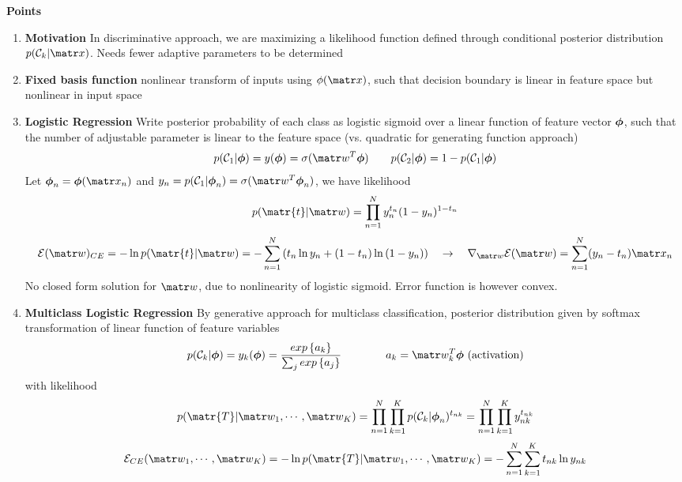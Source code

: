 \documentclass[11pt]{article}
\begin{document}
\begin{defn*}
    \textbf{Points}
    \begin{enumerate}
        \item \textbf{Motivation} In discriminative approach, we are maximizing a likelihood function defined through conditional posterior distribution $p(\calC_k | \bx)$. Needs fewer adaptive parameters to be determined
        \item \textbf{Fixed basis function} nonlinear transform of inputs using $\phi(\bx)$, such that decision boundary is linear in feature space but nonlinear in input space 
        \item \textbf{Logistic Regression} Write posterior probability of each class as logistic sigmoid over a linear function of feature vector $\boldsymbol{\phi}$, such that the number of adjustable parameter is linear to the feature space (vs. quadratic for generating function approach)
        \[
            p(\calC_1 | \bphi) = y(\bphi) = \sigma(\bw^T \bphi)
            \qquad 
            p(\calC_2 | \bphi) = 1 - p(\calC_1 | \bphi)
        \]
        Let $\bphi_n = \bphi(\bx_n)$ and $y_n = p(\calC_1 | \bphi_n) = \sigma(\bw^T \bphi_n)$, we have likelihood
        \[
            p(\matr{t}|\bw) = \prod_{n=1}^N y_n^{t_n} (1-y_n)^{1-t_n}
        \]
        \[
            \mathcal{E}(\bw)_{CE} = -\ln{p(\matr{t}|\bw)} = 
            -\sum_{n=1}^N \left(t_n \ln{y_n} + (1-t_n)\ln{(1-y_n)}\right) 
            \quad \rightarrow \quad 
            \nabla_{\bw} \mathcal{E}(\bw) = \sum_{n=1}^N (y_n-t_n)\bx_n    
        \]
        No closed form solution for $\bw$, due to nonlinearity of logistic sigmoid. Error function is however convex.
        \item \textbf{Multiclass Logistic Regression} By generative approach for multiclass classification, posterior distribution given by softmax transformation of linear function of feature variables 
        \[
            p(\calC_k | \bphi) = y_k(\bphi) = \frac{\exponents{a_k}}  {\sum_j \exponents{a_j}}  
            \qqqquad 
            a_k = \bw_k^T \bphi  \text{ (activation)}
        \]
        with likelihood 
        \[
            p(\matr{T}|\bw_1, \cdots, \bw_K)
            = \prod_{n=1}^N \prod_{k=1}^K p(\calC_k | \bphi_n)^{t_{nk}}  
            = \prod_{n=1}^N \prod_{k=1}^K y_{nk}^{t_{nk}}
        \]
        \[
            \mathcal{E}_{CE}(\bw_1, \cdots, \bw_K) 
            = -\ln{p(\matr{T}|\bw_1, \cdots, \bw_K)}
            = -\sum_{n=1}^N \sum_{k=1}^K t_{nk} \ln{y_{nk}}
        \]

    \end{enumerate}
\end{defn*}
\end{document}
